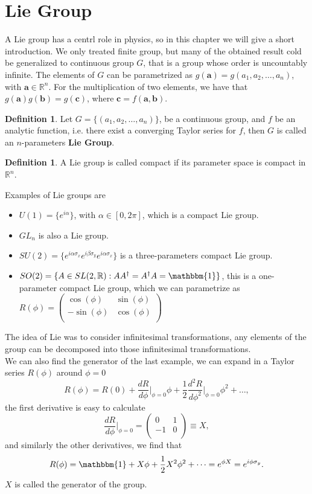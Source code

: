 \documentclass[12pt]{book}
\theoremstyle{plain}
\newcommand{\R}{\mathbb{R}}
\newcommand{\I}{\mathbbm{1}}
\theoremstyle{definition}
\newtheorem{dfn}[thm]{Definition}
\theoremstyle{remark}
\begin{document}
\section{Lie Group}
A Lie group has a centrl role in physics, so in this chapter we will give a short introduction. We only treated finite group, but many of the obtained result cold be generalized to continuous group $G$, that is a group whose order is uncountably infinite. The elements of $G$ can be parametrized as $g(\mathbf{a}) = g(a_1,a_2,\dots,a_n)$, with $\mathbf{a}\in\R^n$. For the multiplication of two elements, we have that $g(\mathbf{a})g(\mathbf{b})=g(\mathbf{c})$, where $\mathbf{c} = f(\mathbf{a},\mathbf{b})$.
\begin{dfn}
Let $G = \{(a_1,a_2,\dots,a_n)\}$, be a continuous group, and $f$ be an analytic function, i.e. there exist a converging Taylor series for $f$, then $G$ is called an $n$-parameters \textbf{Lie Group}.
\end{dfn}
\begin{dfn}
A Lie group is called compact if its parameter space is compact in $\R^n$.
\end{dfn}
Examples of Lie groups are
\begin{itemize}
	\item $U(1) = \{e^{i\alpha}\}$, with $\alpha\in[0,2\pi]$, which is a compact Lie group.
	\item $GL_n$ is also a Lie group.
	\item $SU(2) = \{e^{i\alpha\sigma_x}e^{i\beta\sigma_y}e^{i\alpha\sigma_x}\}$ is a three-parameters compact Lie group.
	\item $SO(2) =\{A\in SL(2,\R): AA^\dagger = A^\dagger A = \I\}$, this is a one-parameter compact Lie group, which we can parametrize as $R(\phi) = \begin{pmatrix}
	\cos(\phi) & \sin(\phi)\\
	-\sin(\phi) & \cos(\phi)\\
	\end{pmatrix}$
\end{itemize}
The idea of Lie was to consider infinitesimal transformations, any elements of the group can be decomposed into those infinitesimal transformations.\\
We can also find the generator of the last example, we can expand in a Taylor series $R(\phi)$ around $\phi=0$
\[R(\phi) = R(0) + \frac{dR}{d\phi}\Bigg|_{\phi=0} \phi + \frac{1}{2}\frac{d^2R}{d\phi^2}\Bigg|_{\phi=0} \phi^2 +\dots,\]
the first derivative is easy to calculate 
\[\frac{dR}{d\phi}\Bigg|_{\phi=0} = \begin{pmatrix}
	0 & 1\\
	-1 & 0\\
	\end{pmatrix}  \equiv X ,\]
and similarly the other derivatives, we find that
\[R(\phi) = \I + X\phi + \frac{1}{2}X^2\phi^2+\dots = e^{\phi X} = e^{i\phi \sigma_y}.\]
$X$ is called the generator of the group.
\end{document}
